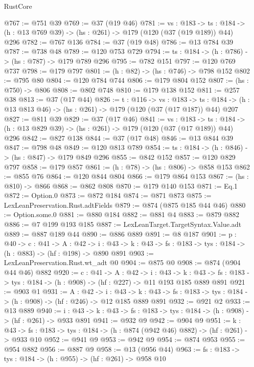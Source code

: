 \begin{lexlean}{RustCore}
\begin{coremodule}
@767 := @751 @39
@769 := @37 (@19 @46)
@781 := {vs : @183} ->
  {ts : @184} -> (h : @13 @769 @39) -> (hs : @261) -> @179 (@120 (@37 (@19 @189)) @44) @296
@782 := @767 @136
@784 := @37 (@19 @48)
@786 := @13 @784 @39
@787 := @738 @48
@789 := @120 @753 @729
@794 := {ts : @184} -> (h : @786) -> (hs : @787) -> @179 @789 @296
@795 := @782 @151
@797 := @120 @769 @737
@798 := @179 @797
@801 := (h : @82) -> (hs : @746) -> @798 @152
@802 := @795 @80
@804 := @120 @784 @744
@806 := @179 @804 @152
@807 := (hs : @750) -> @806
@808 := @802 @748
@810 := @179 @138 @152
@811 := @257 @38
@813 := @37 (@17 @44)
@826 := {t : @116} ->
  {vs : @183} ->
  {ts : @184} -> (h : @13 @813 @46) -> (hs : @261) -> @179 (@120 (@37 (@17 @187)) @44) @207
@827 := @811 @39
@829 := @37 (@17 @46)
@841 := {vs : @183} ->
  {ts : @184} -> (h : @13 @829 @39) -> (hs : @261) -> @179 (@120 (@37 (@17 @189)) @44) @296
@842 := @827 @138
@844 := @37 (@17 @48)
@846 := @13 @844 @39
@847 := @798 @48
@849 := @120 @813 @789
@854 := {ts : @184} -> (h : @846) -> (hs : @847) -> @179 @849 @296
@855 := @842 @152
@857 := @120 @829 @797
@858 := @179 @857
@861 := (h : @78) -> (hs : @806) -> @858 @153
@862 := @855 @76
@864 := @120 @844 @804
@866 := @179 @864 @153
@867 := (hs : @810) -> @866
@868 := @862 @808
@870 := @179 @140 @153
@871 := Eq.{1}
@872 := Option.{0}
@873 := @872 @184
@874 := @871 @873
@875 := LexLeanPreservation.Rust.adtFields
@879 := @874 (@875 @185 @44 @46)
@880 := Option.some.{0}
@881 := @880 @184
@882 := @881 @4
@883 := @879 @882
@886 := @7 @199 @193 @185
@887 := LexLeanTarget.TargetSyntax.Value.adt
@889 := @887 @189 @44
@890 := @886 @889
@891 := @8 @187
@901 := {p : @40} ->
  {c : @41} ->
  {A : @42} ->
  {i : @43} -> {k : @43} -> {fs : @183} -> {tys : @184} -> (h : @883) -> (hf : @198) -> @890 @891
@903 := LexLeanPreservation.Rust.wt_adt @0
@904 := @875 @0
@908 := @874 (@904 @44 @46) @882
@920 := {c : @41} ->
  {A : @42} ->
  {i : @43} ->
  {k : @43} -> {fs : @183} -> {tys : @184} -> (h : @908) -> (hf : @227) -> @11 @193 @185 @889 @891
@921 := @903 @1
@931 := {A : @42} ->
  {i : @43} ->
  {k : @43} -> {fs : @183} -> {tys : @184} -> (h : @908) -> (hf : @246) -> @12 @185 @889 @891
@932 := @921 @2
@933 := @13 @889
@940 := {i : @43} ->
  {k : @43} -> {fs : @183} -> {tys : @184} -> (h : @908) -> (hf : @261) -> @933 @891
@941 := @932 @9
@942 := @904 @9
@951 := {k : @43} ->
  {fs : @183} -> {tys : @184} -> (h : @874 (@942 @46) @882) -> (hf : @261) -> @933 @10
@952 := @941 @9
@953 := @942 @9
@954 := @874 @953
@955 := @954 @882
@956 := @887 @9
@958 := @13 (@956 @44)
@963 := {fs : @183} -> {tys : @184} -> (h : @955) -> (hf : @261) -> @958 @10

\end{coremodule}
\end{lexlean}
